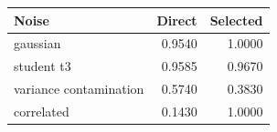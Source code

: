 \begin{tabular}{lrr}
\toprule
Noise & Direct & Selected \\
\midrule
gaussian & 0.9540 & 1.0000 \\
student t3 & 0.9585 & 0.9670 \\
variance contamination & 0.5740 & 0.3830 \\
correlated & 0.1430 & 1.0000 \\
\bottomrule
\end{tabular}
